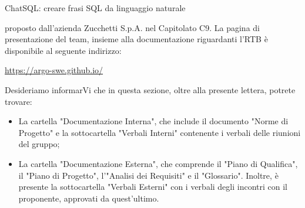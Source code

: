 \quad ChatSQL: creare frasi SQL da linguaggio naturale \newline

proposto dall’azienda Zucchetti S.p.A. nel Capitolato C9.
La pagina di presentazione del team, insieme alla documentazione riguardanti l'RTB è disponibile al seguente indirizzo: \newline

\quad \href{https://argo-swe.github.io/}{https://argo-swe.github.io/} \newline

Desideriamo informarVi che in questa sezione, oltre alla presente lettera, potrete trovare:
\begin{itemize}

  \item La cartella "Documentazione Interna", che include il documento "Norme di Progetto" e la sottocartella "Verbali Interni" contenente i verbali delle riunioni del gruppo;
  \item La cartella "Documentazione Esterna", che comprende il "Piano di Qualifica", il "Piano di Progetto", l'"Analisi dei Requisiti" e il "Glossario". Inoltre, è presente la sottocartella "Verbali Esterni" con i verbali degli incontri con il proponente, approvati da quest'ultimo.\newline
\end{itemize}

